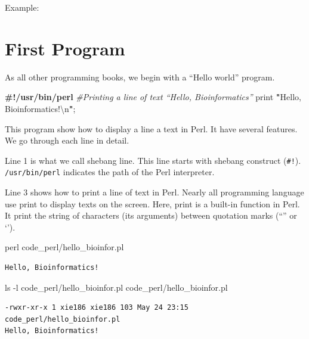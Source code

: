 \documentclass[]{book}
\makeatletter
\newenvironment{Shaded}{\begin{snugshade}}{\end{snugshade}}
\newcommand{\KeywordTok}[1]{\textcolor[rgb]{0.13,0.29,0.53}{\textbf{#1}}}
\newcommand{\CharTok}[1]{\textcolor[rgb]{0.31,0.60,0.02}{#1}}
\newcommand{\StringTok}[1]{\textcolor[rgb]{0.31,0.60,0.02}{#1}}
\newcommand{\CommentTok}[1]{\textcolor[rgb]{0.56,0.35,0.01}{\textit{#1}}}
\newcommand{\FunctionTok}[1]{\textcolor[rgb]{0.00,0.00,0.00}{#1}}
\newcommand{\ExtensionTok}[1]{#1}
\newcommand{\NormalTok}[1]{#1}
\newenvironment{kframe}{%
\medskip{}
\setlength{\fboxsep}{.8em}
 \def\at@end@of@kframe{}%
 \ifinner\ifhmode%
  \def\at@end@of@kframe{\end{minipage}}%
  \begin{minipage}{\columnwidth}%
 \fi\fi%
 \def\FrameCommand##1{\hskip\@totalleftmargin \hskip-\fboxsep
 \colorbox{shadecolor}{##1}\hskip-\fboxsep
     \hskip-\linewidth \hskip-\@totalleftmargin \hskip\columnwidth}%
 \MakeFramed {\advance\hsize-\width
   \@totalleftmargin\z@ \linewidth\hsize
   \@setminipage}}%
 {\par\unskip\endMakeFramed%
 \at@end@of@kframe}
\renewenvironment{Shaded}{\begin{kframe}}{\end{kframe}}
\theoremstyle{definition}
\theoremstyle{definition}
\theoremstyle{definition}
\theoremstyle{remark}
\makeatother
\begin{document}
Example: \citet{DeitelPerl}

\section{First Program}\label{first-program}

As all other programming books, we begin with a ``Hello world'' program.

\begin{Shaded}
\begin{Highlighting}[]
\KeywordTok{#!/usr/bin/perl}
\CommentTok{#Printing a line of text “Hello, Bioinformatics”}
\FunctionTok{print} \KeywordTok{"}\StringTok{Hello, Bioinformatics!}\CharTok{\textbackslash{}n}\KeywordTok{"}\NormalTok{;}
\end{Highlighting}
\end{Shaded}

This program show how to display a line a text in Perl. It have several
features. We go through each line in detail.

Line 1 is what we call shebang line. This line starts with shebang
construct (\texttt{\#!}). \texttt{/usr/bin/perl} indicates the path of
the Perl interpreter.

Line 3 shows how to print a line of text in Perl. Nearly all programming
language use print to display texts on the screen. Here, print is a
built-in function in Perl. It print the string of characters (its
arguments) between quotation marks (``'' or `').

\begin{Shaded}
\begin{Highlighting}[]
\FunctionTok{perl}\NormalTok{ code_perl/hello_bioinfor.pl}
\end{Highlighting}
\end{Shaded}

\begin{verbatim}
Hello, Bioinformatics!
\end{verbatim}

\begin{Shaded}
\begin{Highlighting}[]
\FunctionTok{ls}\NormalTok{ -l code_perl/hello_bioinfor.pl}
\ExtensionTok{code_perl/hello_bioinfor.pl}
\end{Highlighting}
\end{Shaded}

\begin{verbatim}
-rwxr-xr-x 1 xie186 xie186 103 May 24 23:15 code_perl/hello_bioinfor.pl
Hello, Bioinformatics!
\end{verbatim}
\end{document}

